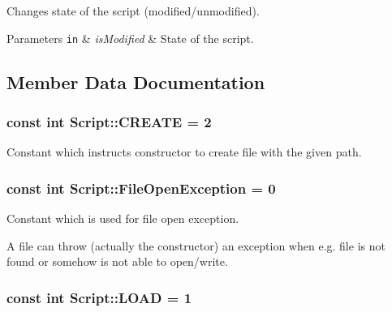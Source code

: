 Changes state of the script (modified/unmodified). 


\begin{DoxyParams}[1]{Parameters}
\mbox{\tt in}  & {\em is\-Modified} & State of the script. \\
\hline
\end{DoxyParams}


\subsection{Member Data Documentation}
\hypertarget{class_script_a5e2d0b611f3dadbc9e79ffe28e1e5257}{
\subsubsection[{C\-R\-E\-A\-T\-E}]{\setlength{\rightskip}{0pt plus 5cm}const int Script\-::\-C\-R\-E\-A\-T\-E = 2\hspace{0.3cm}{\ttfamily [static]}}}\label{class_script_a5e2d0b611f3dadbc9e79ffe28e1e5257}


Constant which instructs constructor to create file with the given path. 

\hypertarget{class_script_a1be7d65c8f9b0db216570980815aacb6}{
\subsubsection[{File\-Open\-Exception}]{\setlength{\rightskip}{0pt plus 5cm}const int Script\-::\-File\-Open\-Exception = 0\hspace{0.3cm}{\ttfamily [static]}}}\label{class_script_a1be7d65c8f9b0db216570980815aacb6}


Constant which is used for file open exception. 

A file can throw (actually the constructor) an exception when e.\-g. file is not found or somehow is not able to open/write. \hypertarget{class_script_a95987e80ff92f659bf2366e6b4a42bb1}{
\subsubsection[{L\-O\-A\-D}]{\setlength{\rightskip}{0pt plus 5cm}const int Script\-::\-L\-O\-A\-D = 1\hspace{0.3cm}{\ttfamily [static]}}}\label{class_script_a95987e80ff92f659bf2366e6b4a42bb1}


